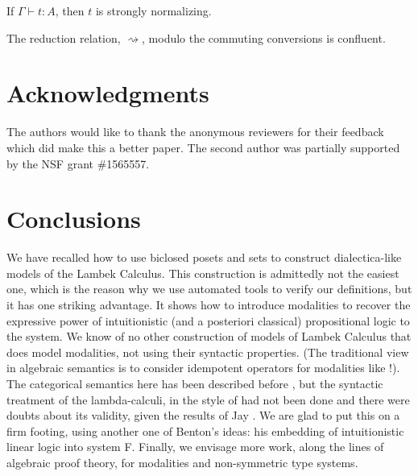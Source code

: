 \documentclass{llncs}
\newcommand{\redto}{\rightsquigarrow}
\newcommand{\Lnt}[1]{\mathit{#1}}
\begin{document}
\begin{theorem}
  \label{theorem:strong_normalization_lambdaL!k}
  If $ \Gamma  \vdash  \Lnt{t}  :  \Lnt{A} $, then $\Lnt{t}$ is strongly normalizing.
\end{theorem}

\begin{theorem}[Confluence]
  \label{theorem:confluence-lambdaL!k}
  The reduction relation, $ \redto $, modulo the commuting conversions
  is confluent.
\end{theorem}

\section{Acknowledgments}
\label{sec:acknowledgments}
The authors would like to thank the anonymous reviewers for their
feedback which did make this a better paper.  The second author was
partially supported by the NSF grant \#1565557.


\section{Conclusions}
We have recalled how to use biclosed posets and sets to construct
dialectica-like models of the Lambek Calculus. This construction is
admittedly not the easiest one, which is the reason why we use
automated tools to verify our definitions, but it has one striking
advantage. It shows how to introduce modalities to recover the
expressive power of intuitionistic (and a posteriori classical)
propositional logic to the system. We know of no other construction of
models of Lambek Calculus that does model modalities, not using their
syntactic properties. (The traditional view in algebraic semantics is
to consider idempotent operators for modalities like !). The
categorical semantics here has been described before
\cite{depaiva1991}, but the syntactic treatment of the lambda-calculi,
in the style of \cite{benton1993} had not been done and there were
doubts about its validity, given the results of Jay \cite{jay1991}. We
are glad to put this on a firm footing, using another one of Benton's
ideas: his embedding of intuitionistic linear logic into system
F. Finally, we envisage more work, along the lines of algebraic proof
theory, for modalities and non-symmetric type systems.
\end{document}
